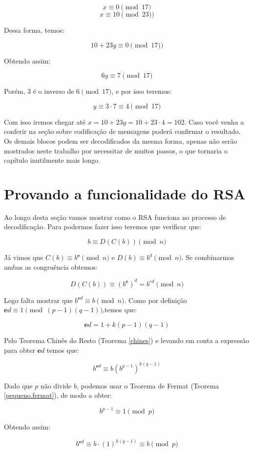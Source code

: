 $$x \equiv 0 \pmod{17}$$
$$x \equiv 10 \pmod{23})$$

Dessa forma, temos: 

$$10 + 23y \equiv 0 \pmod{17})$$

Obtendo assim:

$$6y \equiv 7 \pmod{17}$$

Por\'em, $3$ \'e o inverso de $6 \pmod{17}$, e por isso teremos:

$$y \equiv 3 \cdot 7 \equiv 4 \pmod{17}$$

Com isso iremos chegar at\'e $x = 10 + 23y = 10 + 23 \cdot 4 = 102$. Caso voc\^e venha a conferir na se\c{c}\~ao sobre codifica\c{c}\~ao de mensagens poder\'a confirmar o resultado. Os demais blocos podem ser decodificados da mesma forma, apenas n\~ao ser\~ao mostrados neste trabalho por necessitar de muitos passos, o que tornaria o cap\'itulo inutilmente mais longo.

\section{Provando a funcionalidade do RSA}

Ao longo desta se\c{c}\~ao vamos mostrar como o RSA funciona no processo de decodifica\c{c}\~ao. Para podermos fazer isso teremos que  verificar que:

$$b \equiv D(C(b)) \pmod{n}$$

J\'a vimos que $C(b) \equiv b^\textbf{e} \pmod{n}$ e $D(b) \equiv b^d\pmod{n}$. Se combinarmos ambas as congru\^encia obtemos:

$$D(C(b)) \equiv {(b^\textbf{e})}^d = b^{ed}\pmod{n}$$

Logo falta mostrar que $b^{\textbf{e}d} \equiv b \pmod{n}$. Como por defini\c{c}\~ao $\textbf{e}d \equiv 1 \pmod{(p-1)(q-1)}$,temos que:

$$\textbf{e}d = 1+k(p-1)(q-1)$$

Pelo Teorema Chin\^es do Resto (Teorema \ref{chines}) e levando em conta a express\~ao para obter $\textbf{e}d$ temos que:

$$b^{\textbf{e}d} \equiv b(b^{p-1})^{k(q-1)}$$

Dado que $p$ n\~ao divide $b$, podemos usar o Teorema de Fermat (Teorema \ref{pequeno.fermat}), de modo a obter:

$$b^{p-1} \equiv 1 \pmod{p}$$

Obtendo assim:

$$b^{\textbf{e}d} \equiv b \cdot (1)^{k(q-1)}\equiv b \pmod{p}$$

